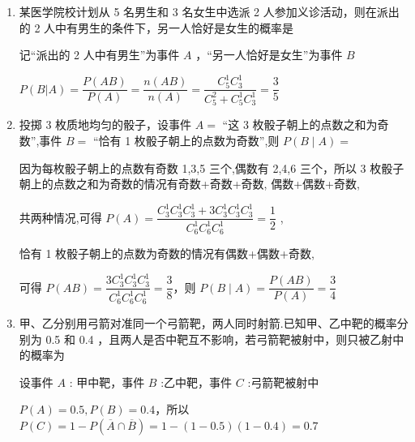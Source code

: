 \begin{enumerate}
\begin{enumerate}
        \item 某医学院校计划从 5 名男生和 3 名女生中选派 2 人参加义诊活动，则在派出的 2 人中有男生的条件下，另一人恰好是女生的概率是
        \begin{jieda}
            记“派出的 2 人中有男生”为事件 $A$ ，“另一人恰好是女生”为事件 $B$
            
            $P\left( {B|A}\right)  = \dfrac{P\left( {AB}\right) }{P\left( A\right) } = \dfrac{n\left( {AB}\right) }{n\left( A\right) } = \dfrac{{{C}}_{5}^{1}{{C}}_{3}^{1}}{{{C}}_{5}^{2} + {{C}}_{5}^{1}{{C}}_{3}^{1}} = \dfrac{3}{5}$
        \end{jieda}
        
        \item 投掷 3 枚质地均匀的骰子，设事件 $A{ = }$ “这 3 枚骰子朝上的点数之和为奇数”,事件 $B{ = }$ “恰有 1 枚骰子朝上的点数为奇数”,则 $P\left( {B \mid  A}\right)  =$
        \begin{jieda}
            因为每枚骰子朝上的点数有奇数 1,3,5 三个,偶数有 2,4,6 三个，所以 3 枚骰子朝上的点数之和为奇数的情况有奇数+奇数+奇数, 偶数+偶数+奇数,
            
            共两种情况,可得 $P\left( A\right)  = \dfrac{{{C}}_{3}^{1}{{C}}_{3}^{1}{{C}}_{3}^1 + 3{{C}}_{3}^1{{C}}_{3}^1{{C}}_{3}^1}{{{C}}_{6}^1{{C}}_{6}^1{{C}}_{6}^1} = \dfrac{1}{2}$ ,
            
            恰有 1 枚骰子朝上的点数为奇数的情况有偶数+偶数+奇数,
            
            可得 $P\left( {AB}\right)  = \dfrac{3{{C}}_{3}^{1}{{C}}_{3}^{1}{{C}}_{3}^{1}}{{{C}}_{6}^{1}{{C}}_{6}^{1}{{C}}_{6}^{1}} = \dfrac{3}{8}$，则 $P\left( {B \mid  A}\right)  = \dfrac{P\left( {AB}\right) }{P\left( A\right) } = \dfrac{3}{4}$
        \end{jieda}
        
        \item 甲、乙分别用弓箭对准同一个弓箭靶，两人同时射箭.已知甲、乙中靶的概率分别为 0.5 和 0.4 ，且两人是否中靶互不影响，若弓箭靶被射中，则只被乙射中的概率为
        \begin{jieda}
            设事件 ${A}$ : 甲中靶，事件 ${B}$ :乙中靶，事件 ${C}$ :弓箭靶被射中
            
            $P\left( A\right)  = {0.5},P\left( B\right)  = {0.4}$，所以 $P\left( C\right)  = 1 - P\left( \overline{A} \cap  \overline{B}\right)  = 1 - \left( {1 - {0.5}}\right) \left( {1 - {0.4}}\right)  = {0.7}$
            

\end{jieda}
\end{enumerate}
\end{enumerate}
